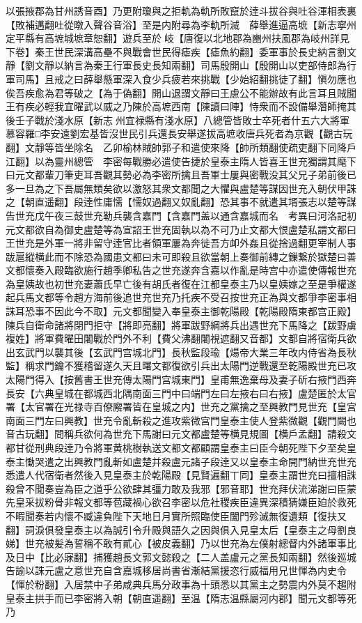 以張掖郡為甘州誘音酉】乃更附瓊與之拒軌為軌所敗竄於逹斗拔谷與吐谷渾相表裏【敗補邁翻吐從暾入聲谷音浴】至是内附尋為李軌所滅　薛舉進逼高墌【新志寧州定平縣有高墌城墌章恕翻】遊兵至於岐【唐復以北地郡為豳州扶風郡為岐州詳見下卷】秦王世民深溝高壘不與戰會世民得瘧疾【瘧魚約翻】委軍事於長史納言劉文靜【劉文靜以納言為秦王行軍長史長知兩翻】司馬殷開山【殷開山以吏部侍郎為行軍司馬】且戒之曰薛舉懸軍深入食少兵疲若來挑戰【少始紹翻挑徒了翻】愼勿應也俟吾疾愈為君等破之【為于偽翻】開山退謂文靜曰王慮公不能辦故有此言耳且賊聞王有疾必輕我宜曜武以威之乃陳於高墌西南【陳讀曰陣】恃衆而不設備舉濳師掩其後壬子戰於淺水原【新志州宜禄縣有淺水原】八總管皆敗士卒死者什五六大將軍慕容羅□李安遠劉宏基皆沒世民引兵還長安舉遂拔高墌收唐兵死者為京觀【觀古玩翻】文靜等皆坐除名　乙卯榆林賊帥郭子和遣使來降【帥所類翻使疏吏翻下同降戶江翻】以為靈州總管　李密每戰勝必遣使告捷於皇泰主隋人皆喜王世充獨謂其麾下曰元文都輩刀筆吏耳吾觀其勢必為李密所擒且吾軍士屢與密戰没其父兄子弟前後已多一旦為之下吾屬無類矣欲以激怒其衆文都聞之大懼與盧楚等謀因世充入朝伏甲誅之【朝直遥翻】段逹性庸懦【懦奴過翻又奴亂翻】恐其事不就遣其壻張志以楚等謀告世充戊午夜三鼓世充勒兵襲含嘉門【含嘉門盖以通含嘉城而名　考異曰河洛記初元文都欲自為御史盧楚等為宣詔王世充固執以為不可乃止文都大恨盧楚私謂文都曰王世充是外軍一將非留守逹官比者領軍屢為奔徙吾方卹外姦且從捨過翻更宰制人事跋扈縱横此而不除恐為國患文都曰未可即殺且欲當朝上奏御前縳之鏁繋於獄楚曰善文都懷奏入殿臨欲施行趙季卿私告之世充遂奔含嘉以作亂是時宫中亦遣使傳報世充為皇姨故也初世充妻蕭氏早亡後有胡氏者復在江都皇泰主乃以皇姨嫁之至是爭權遂起兵馬文都等令趙方海前後追世充世充乃托疾不受召按世充正為與文都爭李密事相誅耳恐事不因此今不取】元文都聞變入奉皇泰主御乾陽殿【乾陽殿隋東都宫正殿】陳兵自衛命諸將閉門拒守【將即亮翻】將軍跋野綱將兵出遇世充下馬降之【跋野虜複姓】將軍費曜田闍戰於門外不利【費父沸翻闍視遮翻又音都】文都自將宿衛兵欲出玄武門以襲其後【玄武門宫城北門】長秋監段瑜【煬帝大業三年改内侍省為長秋監】稱求門鑰不獲稽留遂久天且曙文都復欲引兵出太陽門逆戰還至乾陽殿世充已攻太陽門得入【按舊書王世充傳太陽門宫城東門】皇甫無逸棄母及妻子斫右掖門西奔長安【六典皇城在都城西北隅南面三門中曰端門左曰左掖右曰右掖】盧楚匿於太官署【太官署在光禄寺百僚廨署皆在皇城之内】世充之黨擒之至興教門見世充【皇宫南面三門左曰興教】世充令亂斬殺之進攻紫微宫門皇泰主使人登紫微觀【觀門闕也音古玩翻】問稱兵欲何為世充下馬謝曰元文都盧楚等横見規圖【横戶孟翻】請殺文都甘從刑典段逹乃令將軍黄桃樹執送文都文都顧謂皇泰主曰臣今朝死陛下夕至矣皇泰主慟哭遣之出興教門亂斬如盧楚并殺盧元諸子段逹又以皇泰主命開門納世充世充悉遣人代宿衛者然後入見皇泰主於乾陽殿【見賢遍翻丅同】皇泰主謂世充曰擅相誅殺曾不聞奏豈為臣之道乎公欲肆其彊力敢及我邪【邪音耶】世充拜伏流涕謝曰臣蒙先皇采拔粉骨非報文都等苞藏禍心欲召李密以危社稷疾臣違異深積猜嫌臣廹於救死不暇聞奏若内懷不臧違負陛下天地日月實所照臨使臣闔門殄滅無復遺類【復扶又翻】詞淚俱發皇泰主以為誠引令升殿與語久之因與俱入見皇太后【皇泰主之母劉良娣】世充被髪為誓稱不敢有貳心【被皮義翻】乃以世充為左僕射總督内外諸軍事比及日中【比必寐翻】捕獲趙長文郭文懿殺之【二人盖盧元之黨長知兩翻】然後廵城告諭以誅元盧之意世充自含嘉城移居尚書省漸結黨援恣行威福用兄世惲為内史令【惲於粉翻】入居禁中子弟咸典兵馬分政事為十頭悉以其黨主之勢震内外莫不趨附皇泰主拱手而已李密將入朝【朝直遥翻】至温【隋志温縣屬河内郡】聞元文都等死乃

